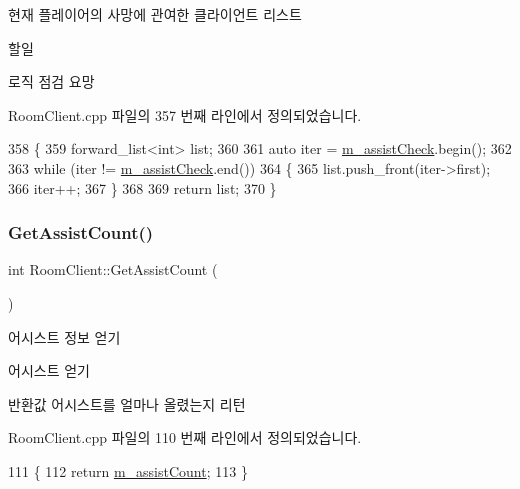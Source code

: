 현재 플레이어의 사망에 관여한 클라이언트 리스트

\begin{DoxyRefDesc}{할일}
\item[\hyperlink{todo__todo000003}{할일}]로직 점검 요망 \end{DoxyRefDesc}


Room\+Client.\+cpp 파일의 357 번째 라인에서 정의되었습니다.


\begin{DoxyCode}
358 \{
359     forward\_list<int> list;
360 
361     \textcolor{keyword}{auto} iter = \hyperlink{class_room_client_a9f63a98f8a902a52bf272f23af3e5f82}{m\_assistCheck}.begin();
362 
363     \textcolor{keywordflow}{while} (iter != \hyperlink{class_room_client_a9f63a98f8a902a52bf272f23af3e5f82}{m\_assistCheck}.end())
364     \{
365         list.push\_front(iter->first);
366         iter++;
367     \}
368 
369     \textcolor{keywordflow}{return} list;
370 \}
\end{DoxyCode}
\mbox{\label{class_room_client_a95b4f7d48d426b554b1cb542450fb089}} 
\subsubsection{\texorpdfstring{Get\+Assist\+Count()}{GetAssistCount()}}
{\footnotesize\ttfamily int Room\+Client\+::\+Get\+Assist\+Count (\begin{DoxyParamCaption}{ }\end{DoxyParamCaption})}



어시스트 정보 얻기 

어시스트 얻기

\begin{DoxyReturn}{반환값}
어시스트를 얼마나 올렸는지 리턴 
\end{DoxyReturn}


Room\+Client.\+cpp 파일의 110 번째 라인에서 정의되었습니다.


\begin{DoxyCode}
111 \{
112     \textcolor{keywordflow}{return} \hyperlink{class_room_client_adacb97c1fec85cb0efef063dc43073f5}{m\_assistCount};
113 \}
\end{DoxyCode}
\mbox{\label{class_room_client_a96701bcafe8b043c50c68b444fcc4ce5}} 
